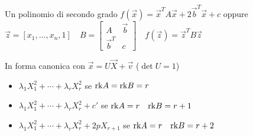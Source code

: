 Un polinomio di secondo grado
$f(\vec{x}) = \vec{x}^TA\vec{x}+2\vec{b}^T\vec{x}+c$
	oppure $\vec{z}=[x_1, \dots, x_n, 1] \quad
	B = \begin{bmatrix}A & \vec{b}\\\vec{b}^T & c\end{bmatrix} \quad
	f(\vec{z}) = \vec{z}^TB\vec{z}$

In forma canonica con $\vec{x} = U\vec{X}+\vec{v}$ ($\det U = 1$)

\begin{itemize}
	\item $\lambda_1X_1^2 + \cdots + \lambda_rX_r^2$ se $\mathrm{rk} A = \mathrm{rk} B = r$
	\item $\lambda_1X_1^2 + \cdots + \lambda_rX_r^2 + c'$ se $\mathrm{rk} A = r \quad \mathrm{rk} B = r+1$
	\item $\lambda_1X_1^2 + \cdots + \lambda_rX_r^2 + 2pX_{r+1}$ se $\mathrm{rk} A = r \quad \mathrm{rk} B = r+2$
\end{itemize}
